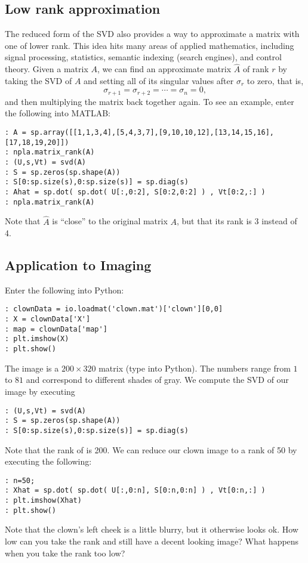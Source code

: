 \subsection{Low rank approximation}

The reduced form of the SVD also provides a way to approximate a
matrix with one of lower rank. This idea hits many areas of applied
mathematics, including signal processing, statistics, semantic
indexing (search engines), and control theory.  Given a matrix $A$,
we can find an approximate matrix $\widehat A$ of rank $r$ by taking
the SVD of $A$ and setting all of its singular values after
$\sigma_r$ to zero, that is,
\[
\sigma_{r+1} = \sigma_{r+2} = \cdots = \sigma_n = 0,
\]
and then multiplying the matrix back together again.  To see an
example, enter the following into MATLAB:

\begin{lstlisting}
: A = sp.array([[1,1,3,4],[5,4,3,7],[9,10,10,12],[13,14,15,16],[17,18,19,20]])
: npla.matrix_rank(A)
: (U,s,Vt) = svd(A)
: S = sp.zeros(sp.shape(A))
: S[0:sp.size(s),0:sp.size(s)] = sp.diag(s)
: Ahat = sp.dot( sp.dot( U[:,0:2], S[0:2,0:2] ) , Vt[0:2,:] )
: npla.matrix_rank(A)
\end{lstlisting}
Note that $\widehat A$ is ``close'' to the original matrix $A$, but
that its rank is 3 instead of 4.

\subsection{Application to Imaging}

Enter the following into Python:
\begin{lstlisting}
: clownData = io.loadmat('clown.mat')['clown'][0,0]
: X = clownData['X']
: map = clownData['map']
: plt.imshow(X)
: plt.show()
\end{lstlisting}
The image  is a $200\times 320$ matrix (type 
into Python).  The numbers range from $1$ to $81$ and
correspond to different shades of gray.  We compute the SVD of our
image  by executing
\begin{lstlisting}
: (U,s,Vt) = svd(A)
: S = sp.zeros(sp.shape(A))
: S[0:sp.size(s),0:sp.size(s)] = sp.diag(s)
\end{lstlisting}
Note that the rank of  is 200.  We can reduce our clown image
to a rank of 50 by executing the following:
\begin{lstlisting}
: n=50;
: Xhat = sp.dot( sp.dot( U[:,0:n], S[0:n,0:n] ) , Vt[0:n,:] )
: plt.imshow(Xhat)
: plt.show()
\end{lstlisting}
Note that the clown's left cheek is a little blurry, but it
otherwise looks ok.  How low can you take the rank and still have a
decent looking image?  What happens when you take the rank too low?

